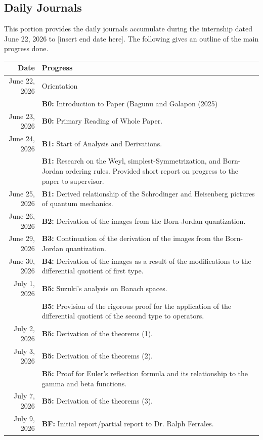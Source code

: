 \documentclass[a4paper]{article}
\begin{document}
	\subsection{Daily Journals}
	This portion provides the daily journals accumulate during the internship dated June 22, 2026 to [insert end date here]. The following gives an outline of the main progress done.
	\begin{table}[h]
		\centering
		\begin{tabular}{r p{4.5in}}
			\hline
			\textbf{Date}&\textbf{Progress}\\
			\hline
			June 22, 2026&Orientation\\
			&\textbf{B0:} Introduction to Paper (Bagunu and Galapon (2025)\\
			June 23, 2026&\textbf{B0:} Primary Reading of Whole Paper.\\
			June 24, 2026&\textbf{B1:} Start of Analysis and Derivations.\\
			&\textbf{B1:} Research on the Weyl, simplest-Symmetrization, and Born-Jordan ordering rules. Provided short report on progress to the paper to supervisor.\\
			June 25, 2026&\textbf{B1:} Derived relationship of the Schrodinger and Heisenberg pictures of quantum mechanics. \\
			June 26, 2026&\textbf{B2:} Derivation of the images from the Born-Jordan quantization.\\
			June 29, 2026&\textbf{B3:} Continuation of the derivation of the images from the Born-Jordan quantization.\\
			June 30, 2026&\textbf{B4:} Derivation of the images as a result of the modifications to the differential quotient of first type.\\
			July 1, 2026&\textbf{B5:} Suzuki’s analysis on Banach spaces.\\
			&\textbf{B5:} Provision of the rigorous proof for the application of the differential quotient of the second type to operators.\\
			July 2, 2026&\textbf{B5:} Derivation of the theorems (1).\\
			July 3, 2026&\textbf{B5:} Derivation of the theorems (2).\\
			&\textbf{B5:} Proof for Euler’s reflection formula and its relationship to the gamma and beta functions.\\
			July 7, 2026&\textbf{B5:} Derivation of the theorems (3).\\
			July 9, 2026&\textbf{BF:} Initial report/partial report to Dr. Ralph Ferrales.\\

\end{tabular}
\end{table}
\end{document}
